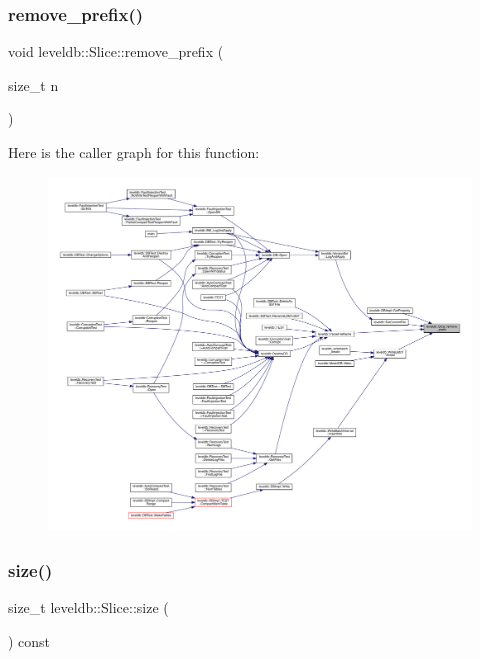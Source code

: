 \mbox{\label{classleveldb_1_1_slice_a1be5b22958a115ebecb2b017aad2b3f6}} 
\subsubsection{\texorpdfstring{remove\_prefix()}{remove\_prefix()}}
{\footnotesize\ttfamily void leveldb\+::\+Slice\+::remove\+\_\+prefix (\begin{DoxyParamCaption}\item[{size\+\_\+t}]{n }\end{DoxyParamCaption})\hspace{0.3cm}{\ttfamily [inline]}}

Here is the caller graph for this function\+:
\nopagebreak
\begin{figure}[H]
\begin{center}
\leavevmode
\includegraphics[width=350pt]{classleveldb_1_1_slice_a1be5b22958a115ebecb2b017aad2b3f6_icgraph}
\end{center}
\end{figure}
\mbox{\label{classleveldb_1_1_slice_a7344120beda110de81d0c45d4cfe4b63}} 
\subsubsection{\texorpdfstring{size()}{size()}}
{\footnotesize\ttfamily size\+\_\+t leveldb\+::\+Slice\+::size (\begin{DoxyParamCaption}{ }\end{DoxyParamCaption}) const\hspace{0.3cm}{\ttfamily [inline]}}

